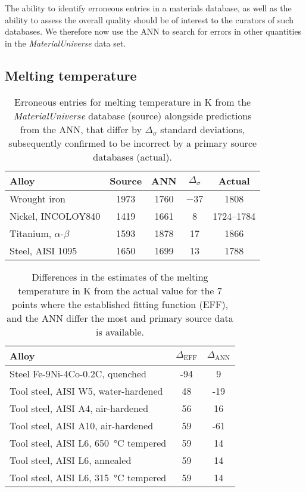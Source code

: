 \documentclass[review]{elsarticle}
\begin{document}
The ability to identify erroneous entries in a materials database, as well as
the ability to assess the overall quality should be of interest to the
curators of such databases. We therefore now use the ANN to search for
errors in other quantities in the \textit{MaterialUniverse} data set.

\subsection{Melting temperature}

\begin{table}
  \caption{Erroneous entries for melting temperature in \si{\kelvin}
    from the \textit{MaterialUniverse} database (source) alongside predictions from the ANN,
    that differ by $\Delta_{\sigma}$ standard deviations, subsequently confirmed
    to be incorrect by a primary source databases (actual).}
  \begin{tabular}{lcccc}
  \bf{Alloy}&
  \bf{Source}& 
  \bf{ANN}&
  $\Delta_\sigma$&
  \bf{Actual}\\
  \hline
  Wrought iron
  &\num{1973}&\num{1760}&\num{-37}&\num{1808}\cite{MatWeb}\\
  Nickel, INCOLOY840& 
  \num{1419}&\num{1661}&\num{8}&\numrange{1724}{1784}\cite{Incoloy840}\\
  Titanium, $\alpha$-$\beta$&   
  \num{1593}&\num{1878}&\num{17}&\num{1866}\cite{MatWeb}\\
  Steel, AISI 1095
  &\num{1650}&\num{1699}&\num{13}&\num{1788}\cite{AZOMaterials}
\end{tabular}
  \label{tab:4-02-temperatures}
\end{table}

\begin{table}
  \caption{Differences in the estimates of the melting temperature in
    \si{\kelvin} from the actual value for the 7 points where the
    established fitting function (EFF), and the ANN differ the most
    and primary source data is available.}
  \begin{tabular}{lcc}
  \bf{Alloy}& 
  $\Delta_\textrm{EFF}$& 
  $\Delta_\textrm{ANN}$\\ 
  \hline
  Steel Fe-9Ni-4Co-0.2C, quenched\cite{MetalSuppliersOnline}
  &-94&9\\
  Tool steel, AISI W5, water-hardened\cite{MetalSuppliersOnline}
  &48&-19\\
  Tool steel, AISI A4, air-hardened\cite{MetalSuppliersOnline}
  &56&16\\
  Tool steel, AISI A10, air-hardened\cite{AZOMaterials}
  &59&-61\\
  Tool steel, AISI L6, \SI{650}{\celsius} tempered\cite{MetalSuppliersOnline}
  &59&14\\
  Tool steel, AISI L6, annealed\cite{MetalSuppliersOnline}
  &59&14\\
  Tool steel, AISI L6, \SI{315}{\celsius} tempered\cite{MetalSuppliersOnline}
  &59&14
\end{tabular}
  \label{tab:4-08-temperatures-delta}
\end{table}
\end{document}
